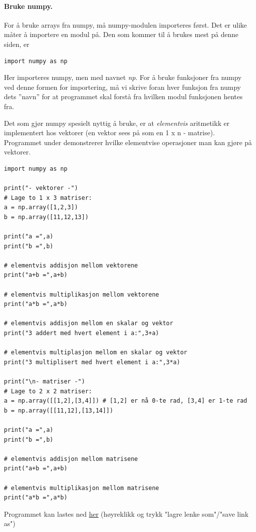 \documentclass[%
oneside,                 %
final,                   %
10pt]{article}
\begin{document}
\paragraph{Bruke numpy.}
For å bruke arrays fra numpy, må numpy-modulen importeres først.
Det er ulike måter å importere en modul på.
Den som kommer til å brukes mest på denne siden, er
\begin{verbatim}
import numpy as np
\end{verbatim}
Her importeres numpy, men med navnet \emph{np}. For å bruke funksjoner fra numpy ved denne formen for importering, må vi
skrive foran hver funksjon fra numpy dets ''navn'' for at programmet skal forstå fra hvilken modul funksjonen hentes fra.

Det som gjør numpy spesielt nyttig å bruke, er at \emph{elementvis} aritmetikk er implementert hos vektorer (en vektor sees på som en 1 x n - matrise).
Programmet under demonstrerer hvilke elementvise operasjoner man kan gjøre på vektorer.
\begin{verbatim}
import numpy as np

print("- vektorer -")
# Lage to 1 x 3 matriser:
a = np.array([1,2,3])
b = np.array([11,12,13])

print("a =",a)
print("b =",b)

# elementvis addisjon mellom vektorene
print("a+b =",a+b)

# elementvis multiplikasjon mellom vektorene
print("a*b =",a*b)

# elementvis addisjon mellom en skalar og vektor
print("3 addert med hvert element i a:",3+a)

# elementvis multiplasjon mellom en skalar og vektor
print("3 multiplisert med hvert element i a:",3*a)

print("\n- matriser -")
# Lage to 2 x 2 matriser:
a = np.array([[1,2],[3,4]]) # [1,2] er nå 0-te rad, [3,4] er 1-te rad
b = np.array([[11,12],[13,14]])

print("a =",a)
print("b =",b)

# elementvis addisjon mellom matrisene
print("a+b =",a+b)

# elementvis multiplikasjon mellom matrisene
print("a*b =",a*b)
\end{verbatim}
Programmet kan lastes ned \href{{https://github.com/krisbhei/INF2310/raw/master/Programmering/Python/aritmetikk_numpy.py}}{her} (høyreklikk og trykk "lagre lenke som"/"save link as")
\end{document}
